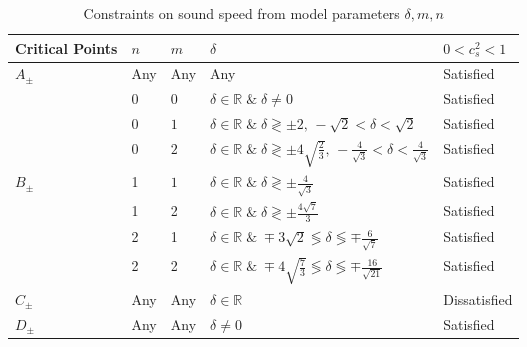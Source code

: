 \documentclass[a4paper,12pt]{article}
\begin{document}
\begin{table}[h!]
\centering
\begin{tabular}{|p{1.5cm}|p{1cm}|p{1cm}|p{7cm}|p{2cm}|}
\hline
Critical Points & $n$ & $m$ & $\delta$ &  $0<c_s^2<1$ \\
\hline
\hline
$ A_{\pm} $ & Any & Any & Any & Satisfied\\
\hline
& 0 & $ 0 $ & $\delta \in \mathbb{R}\;  \& \;  \delta \ne 0 $ & Satisfied      \\
			
& 0 & $ 1 $ & $\delta \in \mathbb{R}\;  \& \;  \delta \gtrless \pm 2,\, -\sqrt{2}<\delta <\sqrt{2} $ & Satisfied      \\
			
& 0 & $ 2 $ & $\delta \in \mathbb{R}\;   \& \; \delta \gtrless \pm 4 \sqrt{\frac{2}{3}},\,-\frac{4}{\sqrt{3}}<\delta <\frac{4}{\sqrt{3}} $ & Satisfied \\
			
$ B_{\pm} $	 & 1 & $ 1 $	& $ \delta \in \mathbb{R} \; \&  \; \delta \gtrless \pm \frac{4}{ \sqrt{3}} $ & Satisfied \\
			
& 1 & 2 & $ \delta \in \mathbb{R} \; \&  \; \delta \gtrless \pm \frac{4 \sqrt{7}}{3} $ & Satisfied \\
			
& 2 & 1 & $ \delta \in \mathbb{R} \; \&  \;   \mp 3\sqrt{2}  \lessgtr \delta \lessgtr  \mp \frac{6}{\sqrt{7}}$  & Satisfied  \\
			
& 2 & 2 &  $ \delta \in \mathbb{R} \; \&  \; \mp 4\sqrt{\frac{7}{3}} \lessgtr \delta \lessgtr \mp \frac{16}{\sqrt{21} } $ &  Satisfied \\
\hline 
$ C_{\pm} $  & Any& Any & $ \delta \in \mathbb{R} $ & Dissatisfied \\
\hline
$ D_{\pm} $  & Any& Any & $ \delta \ne 0 $ & Satisfied \\
\hline  
\end{tabular}
\caption{Constraints on sound speed from model parameters $\delta,m,n$}
\label{Tab:M2c}
\end{table}
\end{document}
